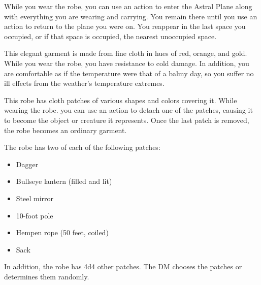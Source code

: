 \documentclass[10pt,a4paper,twoside,bg=print,twocolumn,openany,nodeprecatedcode]{dndbook}
\begin{document}
While you wear the robe, you can use an action to enter the Astral Plane along with everything you are wearing and carrying. You remain there until you use an action to return to the plane you were on. You reappear in the last space you occupied, or if that space is occupied, the nearest unoccupied space.

This elegant garment is made from fine cloth in hues of red, orange, and gold. While you wear the robe, you have resistance to cold damage. In addition, you are comfortable as if the temperature were that of a balmy day, so you suffer no ill effects from the weather's temperature extremes.

This robe has cloth patches of various shapes and colors covering it. While wearing the robe. you can use an action to detach one of the patches, causing it to become the object or creature it represents. Once the last patch is removed, the robe becomes an ordinary garment.

The robe has two of each of the following patches:


\begin{itemize}
\item Dagger
\item Bullseye lantern (filled and lit)
\item Steel mirror
\item 10-foot pole
\item Hempen rope (50 feet, coiled)
\item Sack
\end{itemize}

In addition, the robe has 4d4 other patches. The DM chooses the patches or determines them randomly.
\end{document}
